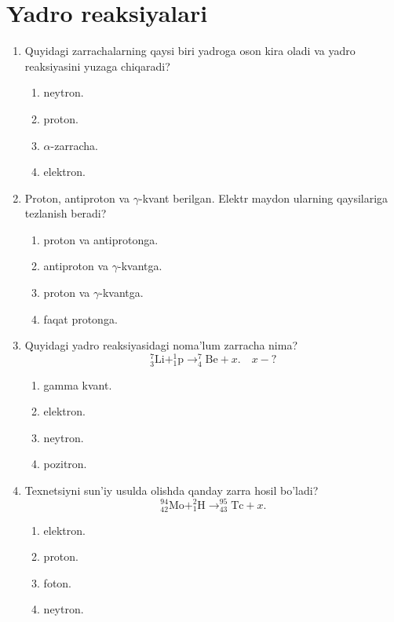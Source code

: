 \section{Yadro reaksiyalari}



\begin{enumerate}

\item Quyidagi zarrachalarning qaysi biri yadroga oson kira oladi va yadro reaksiyasini yuzaga chiqaradi?
\begin{enumerate}[label=\Alph*)]
\item neytron.
\item proton.
\item $\alpha$-zarracha.
\item elektron.
\end{enumerate}

\item Proton, antiproton va $\gamma$-kvant berilgan. Elektr maydon ularning qaysilariga tezlanish beradi?
\begin{enumerate}[label=\Alph*)]
\item proton va antiprotonga.
\item antiproton va $\gamma$-kvantga.
\item proton va $\gamma$-kvantga.
\item faqat protonga.
\end{enumerate}

\item Quyidagi yadro reaksiyasidagi noma'lum zarracha nima?
$$^7_3\text{Li} + ^1_1\text{p} \rightarrow ^7_4\text{Be} + x. \quad x - ?$$
\begin{enumerate}[label=\Alph*)]
\item gamma kvant.
\item elektron.
\item neytron.
\item pozitron.
\end{enumerate}

\item Texnetsiyni sun'iy usulda olishda qanday zarra hosil bo'ladi?
$$^{94}_{42}\text{Mo} + ^2_1\text{H} \rightarrow ^{95}_{43}\text{Tc} + x.$$
\begin{enumerate}[label=\Alph*)]
\item elektron.
\item proton.
\item foton.
\item neytron.
\end{enumerate}


\end{enumerate}
